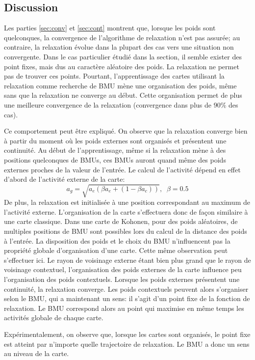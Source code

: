 \subsection{Discussion}
Les parties \ref{sec:conv} et \ref{sec:cont} montrent que, lorsque les poids sont quelconques, la convergence de l'algorithme de relaxation n'est pas assurée; au contraire, la relaxation évolue dans la plupart des cas vers une situation non convergente. Dans le cas particulier étudié dans la section, il semble exister des point fixes, mais dus au caractère aléatoire des poids. La relaxation ne permet pas de trouver ces points. Pourtant, l'apprentissage des cartes utilisant la relaxation comme recherche de BMU mène une organisation des poids, même sans que la relaxation ne converge au début. Cette organisation permet de plus une meilleure convergence de la relaxation (convergence dans plus de $90 \%$ des cas).

Ce comportement peut être expliqué. On observe que la relaxation converge bien à partir du moment où les poids externes sont organisés et présentent une continuité. Au début de l'apprentissage, même si la relaxation mène à des positions quelconques de BMUs, ces BMUs auront quand même des poids externes proches de la valeur de l'entrée. Le calcul de l'activité dépend en effet d'abord de l'activité externe de la carte:
$$ a_g = \sqrt{a_e ( \beta a_e + (1-\beta a_c))}, \;\; \beta=0.5$$ 
De plus, la relaxation est initialisée à une position correspondant au maximum de l'activité externe.
L'organisation de la carte s'effectuera donc de façon similaire à une carte classique. Dans une carte de Kohonen, pour des poids aléatoires, de multiples positions de BMU sont possibles lors du calcul de la distance des poids à l'entrée. La disposition des poids et le choix du BMU n'influencent pas la propriété globale d'organisation d'une carte. Cette même observation peut s'effectuer ici. 
Le rayon de voisinage externe étant bien plus grand que le rayon de voisinage contextuel, l'organisation des poids externes de la carte influence peu l'organisation des poids contextuels.
Lorsque les poids externes présentent une continuité, la relaxation converge. Les poids contextuels peuvent alors s'organiser selon le BMU, qui a maintenant un sens: il s'agit d'un point fixe de la fonction de relaxation. Le BMU correspond alors au point qui maximise en même temps les activités globale de chaque carte.

Expérimentalement, on observe que, lorsque les cartes sont organisés, le point fixe est atteint par n'importe quelle trajectoire de relaxation. Le BMU a donc un sens au niveau de la carte. 

